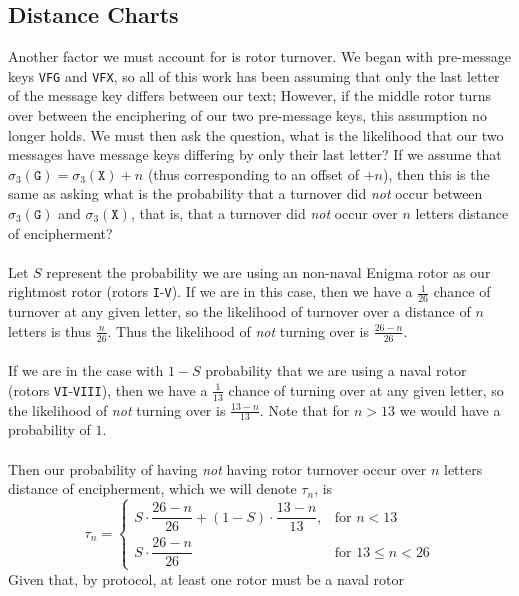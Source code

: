   \subsection{Distance Charts}\label{distance_chart}
  Another factor we must account for is rotor turnover. We began with
  pre-message keys \texttt{VFG} and \texttt{VFX}, so all of this work
  has been assuming that only the last letter of the message key
  differs between our text; However, if the middle rotor turns over
  between the enciphering of our two pre-message keys, this
  assumption no longer holds. We must then ask the question, what is
  the likelihood that our two messages have message keys differing by
  only their last letter? If we assume that $\sigma_3(\texttt{G}) =
  \sigma_3(\texttt{X}) + n$ (thus corresponding to an offset of
  $+n$), then this is the same as asking what is the probability that
  a turnover did \emph{not} occur between $\sigma_3(\texttt{G})$ and
  $\sigma_3(\texttt{X})$, that is, that a turnover did \emph{not}
  occur over $n$ letters distance of encipherment?
  \\\\Let $S$ represent the probability we are using an non-naval
  Enigma rotor as our rightmost rotor (rotors \texttt{I}-\texttt{V}).
  If we are in this case, then we have a $\frac{1}{26}$ chance of
  turnover at any given letter, so the likelihood of turnover over a
  distance of $n$ letters is thus $\frac{n}{26}$. Thus the likelihood
  of \emph{not} turning over is $\frac{26-n}{26}$.
  \\\\If we are in the case with $1-S$ probability that we are using
  a naval rotor (rotors \texttt{VI}-\texttt{VIII}), then we have a
  $\frac{1}{13}$ chance of turning over at any given letter, so the
  likelihood of \emph{not} turning over is $\frac{13-n}{13}$. Note
  that for $n>13$ we would have a probability of $1$.
  \\\\Then our probability of having \emph{not} having rotor turnover
  occur over $n$ letters distance of encipherment, which we will
  denote $\tau_n$, is
  \[
    \tau_n =
    \begin{cases}
      S \cdot \dfrac{26 - n}{26} + (1 - S) \cdot \dfrac{13 - n}{13},
      & \text{for } n < 13        \\
      S \cdot \dfrac{26 - n}{26}
      & \text{for } 13 \le n < 26
    \end{cases}
  \]
  Given that, by protocol, at least one rotor must be a naval rotor
